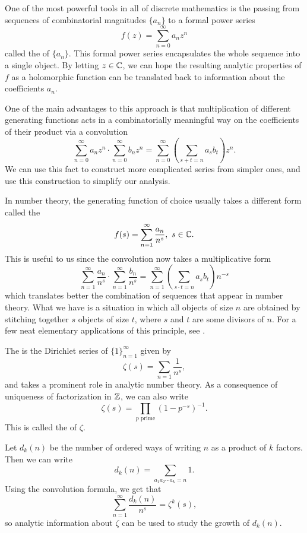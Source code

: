 \documentclass[12pt, a4paper]{report}
\begin{document}
One of the most powerful tools in all of discrete mathematics is the passing
from sequences of combinatorial magnitudes $\{a_n\}$ to a formal power series
\[f(z) = \sum\limits_{n=0}^\infty a_nz^n\]
called the  of $\{a_n\}.$ This formal power series
encapsulates the whole sequence into a single object. By letting $z \in {\mathbb C}$,
we can hope the
resulting analytic properties of $f$ as a holomorphic function can be translated
back to information about the coefficients $a_n$.

One of the main advantages to
this approach is that multiplication of different generating functions acts in
a combinatorially meaningful way on the coefficients of their product via a
convolution
\[\sum\limits_{n=0}^\infty a_n z^n \cdot \sum_{n=0}^\infty b_n z^n =
\sum\limits_{n=0}^\infty \left( \sum\limits_{s+t = n} a_sb_t \right)z^n.\]
We can use this fact to construct more complicated series from
simpler ones, and use this construction to simplify our analysis.

In number theory, the generating function of choice usually takes a different
form called the 
\[f(s) = \sum\limits_{n=1}^\infty\frac{a_n}{n^s}, \,\, s \in {\mathbb C}. \]
This is useful to us since the convolution now takes a multiplicative form
\[\sum\limits_{n=1}^\infty\frac{a_n}{n^s} \cdot
  \sum\limits_{n=1}^\infty\frac{b_n}{n^s} =
  \sum\limits_{n=1}^\infty \left( \sum\limits_{s \cdot t = n} a_sb_t \right) n^{-s}\]
which translates better the combination of sequences that appear in number
theory. What we have is a situation in which all
objects of size $n$ are obtained by stitching together $s$ objects of size $t$,
where $s$ and $t$ are some divisors of $n$.
For a few neat elementary applications of this principle, see \cite[Section 2.6, pages 59-68]{wilf}.

\begin{example}
  The  is the Dirichlet series of
  $\{1\}_{n=1}^\infty$ given by
  \[\zeta(s) = \sum\limits_{n=1} \frac{1}{n^s},\]
  and takes a prominent role in analytic number theory.
  As a consequence of uniqueness of factorization in ${\mathbb Z}$, we can also write
  \[\zeta(s) = \prod\limits_{p \text{ prime}}\left( 1-p^{-s} \right)^{-1}.\]
  This is called the  of $\zeta.$
\end{example}

\begin{example}
  Let $d_k(n)$ be the number of ordered ways of writing $n$ as a product of $k$
  factors. Then we can write
  \[d_k(n) = \sum\limits_{a_1 a_2 \cdots a_k = n} 1.\]
  Using the convolution formula, we get that
  \[\sum\limits_{n=1}^\infty \frac{d_k(n)}{n^s} = \zeta^k(s),\]
  so analytic information about $\zeta$ can be used to study the growth of
  $d_k(n).$
\end{example}
\end{document}
